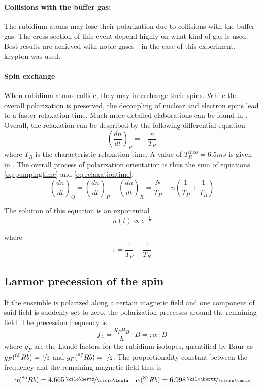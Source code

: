 \paragraph{Collisions with the buffer gas:}
The rubidium atoms may lose their polarization due to collisions with the buffer gas. The cross section of this event depend highly on what kind of gas is used. Best results are achieved with noble gases - in the case of this experiment, krypton was used.
\paragraph{Spin exchange}
When rubidium atoms collide, they may interchange their spins. While the overall polarization is preserved, the decoupling of nuclear and electron spins lead to a faster relaxation time. Much more detailed elaborations can be found in \cite{happer}.\\

Overall, the relaxation can be described by the following differential equation
\begin{equation}
\left(\frac{dn}{dt}\right)_R=-\frac{n}{T_R}
\label{eq:relaxationtime}
\end{equation}
where $T_R$ is the characteristic relaxation time. A value of $T^{theo}_R=\unit{6.5}{ms}$ is given in \cite{staatsex}. The overall process of polarization orientation is thus the sum of equations \ref{eq:pumpingtime} and \ref{eq:relaxationtime}:
\begin{equation}
\left(\frac{dn}{dt}\right)_O=\left(\frac{dn}{dt}\right)_P+\left(\frac{dn}{dt}\right)_R=\frac{N}{T_P}-n\left(\frac{1}{T_P}+\frac{1}{T_R}\right)
\end{equation}

The solution of this equation is an exponential
\begin{equation}
n(t)\propto e^{-\frac{t}{\tau}}
\label{eq:orientationexponential}
\end{equation}

where 
\begin{equation}
\tau=\frac{1}{T_P}+\frac{1}{T_R}\label{eq:tauIrelation}
\end{equation}
\subsection{Larmor precession of the spin}
If the ensemble is polarized along a certain magnetic field and one component of said field is suddenly set to zero, the polarization precesses around the remaining field. The precession frequency is
\begin{equation}
f_L=\frac{g_F\mu_B}{h}\cdot B =: \alpha\cdot B
\label{eq:precessionfreq}
\end{equation}
where $g_F$ are the Landé factors for the rubidium isotopes, quantified by Baur \cite{staatsex} as $g_F(^{85}Rb)=\nicefrac{1}{3}$ and $g_F(^{87}Rb)=\nicefrac{1}{2}$. The proportionality constant between the frequency and the remaining magnetic field thus is 
\begin{equation}
\alpha(^{85}Rb)=\unitfrac[4.665]{\kilo\hertz}{\micro\tesla}\quad \alpha(^{87}Rb)=\unitfrac[6.998]{\kilo\hertz}{\micro\tesla}
\end{equation}

